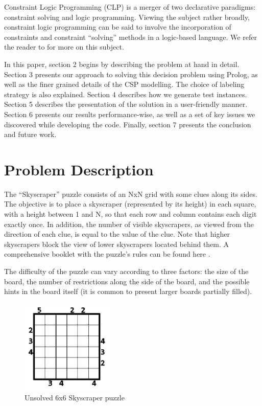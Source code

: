 \documentclass{llncs}
\begin{document}
Constraint Logic Programming (CLP) is a merger of two declarative paradigms: constraint solving and logic programming. Viewing the subject rather broadly, constraint logic programming can be said to involve the incorporation of constraints and constraint “solving” methods in a logic-based language. We refer the reader to \cite{jaffar_maher_1994} for more on this subject.

In this paper, section 2 begins by describing the problem at hand in detail. Section 3 presents our approach to solving this decision problem using Prolog, as well as the finer grained details of the CSP modelling. The choice of labeling strategy is also explained. Section 4 describes how we generate test instances. Section 5 describes the presentation of the solution in a user-friendly manner. Section 6 presents our results performance-wise, as well as a set of key issues we discovered while developing the code. Finally, section 7 presents the conclusion and future work.

%
\section{Problem Description}
%
The ``Skyscraper'' puzzle consists of an NxN grid with some clues along its sides. The objective is to place a skyscraper (represented by its height) in each square, with a height between 1 and N, so that each row and column contains each digit exactly once. In addition, the number of visible skyscrapers, as viewed from the direction of each clue, is equal to the value of the clue. Note that higher skyscrapers block the view of lower skyscrapers located behind them. A comprehensive booklet with the puzzle's rules can be found here \cite{skyscrapers_booklet}.

The difficulty of the puzzle can vary according to three factors: the size of the board, the number of restrictions along the side of the board, and the possible hints in the board itself (it is common to present larger boards partially filled).

\begin{figure}[h!]
\begin{center}
\includegraphics[height=4.5cm,width=4.5cm]{images/skyscraper_unsolved.png}
\caption{Unsolved 6x6 Skyscraper puzzle}
\label{Figure 1}
\end{center}
\end{figure}
\end{document}
